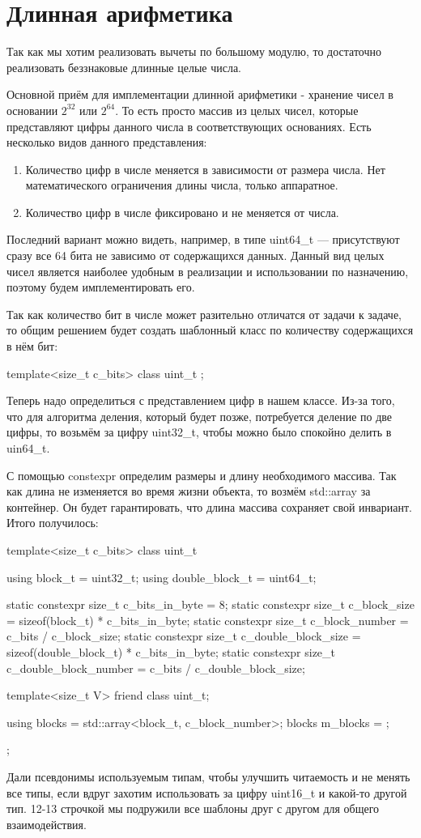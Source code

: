 
\section{Длинная арифметика}
Так как мы хотим реализовать вычеты по большому модулю, то достаточно реализовать беззнаковые длинные целые числа.

Основной приём для имплементации длинной арифметики - хранение чисел в основании $2^{32}$ или $2^{64}$. То есть просто массив из целых чисел, которые представляют цифры данного числа в соответствующих основаниях. Есть несколько видов данного представления:
\begin{enumerate}
  \item Количество цифр в числе меняется в зависимости от размера числа. Нет математического ограничения длины числа, только аппаратное.
  \item Количество цифр в числе фиксировано и не меняется от числа.
\end{enumerate}
Последний вариант можно видеть, например, в типе uint64\_t --- присутствуют сразу все 64 бита не зависимо от содержащихся данных. Данный вид целых чисел является наиболее удобным в реализации и использовании по назначению, поэтому будем имплементировать его.

Так как количество бит в числе может разительно отличатся от задачи к задаче, то общим решением будет создать шаблонный класс по количеству содержащихся в нём бит:
\begin{cppcode}
template<size_t c_bits>
class uint_t {
};
\end{cppcode}
Теперь надо определиться с представлением цифр в нашем классе. Из-за того, что для алгоритма деления, который будет позже, потребуется деление по две цифры, то возьмём за цифру uint32\_t, чтобы можно было спокойно делить в uin64\_t.

С помощью constexpr определим размеры и длину необходимого массива. Так как длина не изменяется во время жизни объекта, то возмём std::array за контейнер. Он будет гарантировать, что длина массива сохраняет свой инвариант. Итого получилось:
\begin{cppcode}
template<size_t c_bits>
class uint_t {
    using block_t = uint32_t;
    using double_block_t = uint64_t;

    static constexpr size_t c_bits_in_byte = 8;
    static constexpr size_t c_block_size = sizeof(block_t) * c_bits_in_byte;
    static constexpr size_t c_block_number = c_bits / c_block_size;
    static constexpr size_t c_double_block_size = sizeof(double_block_t) * c_bits_in_byte;
    static constexpr size_t c_double_block_number = c_bits / c_double_block_size;

    template<size_t V>
    friend class uint_t;

    using blocks = std::array<block_t, c_block_number>;
    blocks m_blocks = {};
};
\end{cppcode}
Дали псевдонимы используемым типам, чтобы улучшить читаемость и не менять все типы, если вдруг захотим использовать за цифру uint16\_t и какой-то другой тип. 12-13 строчкой мы подружили все шаблоны друг с другом для общего взаимодействия.

